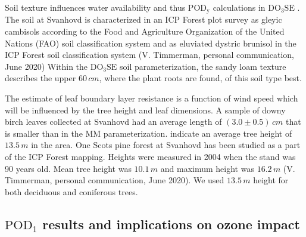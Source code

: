 \documentclass[bg, manuscript]{copernicus}
\begin{document}
Soil texture influences water availability and thus $\mathrm{POD_y}$ calculations in $\mathrm{DO_3SE}$ \citep{ACP:Bueker2012}. The soil at Svanhovd is characterized in an ICP Forest plot survey as gleyic cambisols according to the Food and Agriculture Organization of the United Nations (FAO) soil classification system and as eluviated dystric brunisol in the ICP Forest soil classification system (V. Timmerman, personal communication, June 2020) Within the $\mathrm{DO_3SE}$ soil parameterization, the sandy loam texture describes the upper $60\,\unit{cm}$, where the plant roots are found, of this soil type best. 

The estimate of leaf boundary layer resistance is a function of wind speed which will be influenced by the tree height and leaf dimensions. A sample of downy birch leaves collected at Svanhovd had an average length of $(3.0\pm 0.5)\,\unit{cm}$ that is smaller than in the MM parameterization. \citet[][p.~52]{NINA2004} indicate an average tree height of $13.5\,\unit{m}$ in the area. One Scots pine forest at Svanhovd has been studied as a part of the ICP Forest mapping. Heights were measured in 2004 when the stand was 90 years old. Mean tree height was $10.1\,\unit{m}$ and maximum height was $16.2\,\unit{m}$ (V. Timmerman, personal communication, June 2020). We used $13.5\,\unit{m}$ height for both deciduous and coniferous trees.

\subsection{$\mathrm{POD_1}$ results and implications on ozone impact}
\label{subsec:do3se_results}
\end{document}
